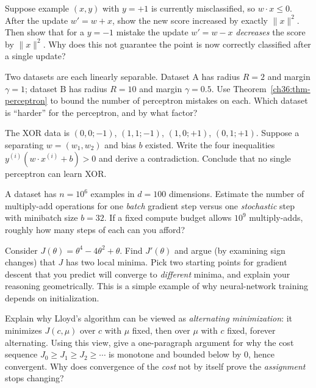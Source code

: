 \begin{exercise}[Why $y\,x$?]
\label{ch36:ex-perceptron-fix}
Suppose example $(x,y)$ with $y=+1$ is currently misclassified, so
$w\cdot x \le 0$. After the update $w' = w + x$, show the new score increased by
exactly $\lVert x\rVert^2$. Then show that for a $y=-1$ mistake the update
$w' = w - x$ \emph{decreases} the score by $\lVert x\rVert^2$. Why does this not
guarantee the point is now correctly classified after a single update?
\end{exercise}

\begin{exercise}
\label{ch36:ex-margin}
Two datasets are each linearly separable. Dataset A has radius $R=2$ and margin
$\gamma = 1$; dataset B has radius $R = 10$ and margin $\gamma = 0.5$. Use
Theorem~\ref{ch36:thm-perceptron} to bound the number of perceptron mistakes on
each. Which dataset is ``harder'' for the perceptron, and by what factor?
\end{exercise}

\begin{exercise}
\label{ch36:ex-xor}
The XOR data is $(0,0;-1)$, $(1,1;-1)$, $(1,0;+1)$, $(0,1;+1)$. Suppose a
separating $w=(w_1,w_2)$ and bias $b$ existed. Write the four inequalities
$y^{(i)}(w\cdot x^{(i)} + b) > 0$ and derive a contradiction. Conclude that no
single perceptron can learn XOR.
\end{exercise}

\begin{exercise}
\label{ch36:ex-sgd}
A dataset has $n = 10^6$ examples in $d = 100$ dimensions. Estimate the number of
multiply-add operations for one \emph{batch} gradient step versus one
\emph{stochastic} step with minibatch size $b = 32$. If a fixed compute budget
allows $10^9$ multiply-adds, roughly how many steps of each can you afford?
\end{exercise}

\begin{exercise}
\label{ch36:ex-nonconvex}
Consider $J(\theta) = \theta^4 - 4\theta^2 + \theta$. Find $J'(\theta)$ and argue
(by examining sign changes) that $J$ has two local minima. Pick two starting
points for gradient descent that you predict will converge to \emph{different}
minima, and explain your reasoning geometrically. This is a simple example of
why neural-network training depends on initialization.
\end{exercise}

\begin{exercise}
\label{ch36:ex-coord}
Explain why Lloyd's algorithm can be viewed as \emph{alternating minimization}:
it minimizes $J(c,\mu)$ over $c$ with $\mu$ fixed, then over $\mu$ with $c$
fixed, forever alternating. Using this view, give a one-paragraph argument for
why the cost sequence $J_0 \ge J_1 \ge J_2 \ge \cdots$ is monotone and bounded
below by $0$, hence convergent. Why does convergence of the \emph{cost} not by
itself prove the \emph{assignment} stops changing?
\end{exercise}

